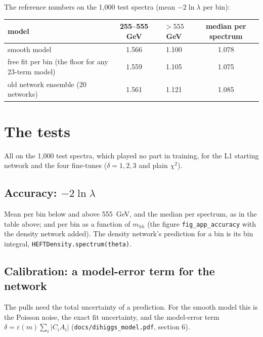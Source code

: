 \documentclass[11pt]{article}
\newcommand{\file}[1]{\nolinkurl{#1}}
\newcommand{\code}[1]{\texttt{#1}}
\newcommand{\mhh}{m_{hh}}
\begin{document}
The reference numbers on the 1,000 test spectra (mean $-2\ln\lambda$ per bin):

\begin{center}
\small
\begin{tabular}{lccc}
\toprule
model & 255--555 GeV & $>555$ GeV & median per spectrum\\
\midrule
smooth model & 1.566 & 1.100 & 1.078\\
free fit per bin (the floor for any 23-term model) & 1.559 & 1.105 & 1.075\\
old network ensemble (20 networks) & 1.561 & 1.121 & 1.085\\
\bottomrule
\end{tabular}
\end{center}

\section{The tests}
\label{sec:tests}

All on the 1,000 test spectra, which played no part in training, for the L1 starting network and
the four fine-tunes ($\delta = 1, 2, 3$ and plain $\chi^2$).

\subsection{Accuracy: $-2\ln\lambda$}

Mean per bin below and above 555~GeV, and the median per spectrum, as in the table above; and per
bin as a function of $\mhh$ (the figure \file{fig_app_accuracy} with the density network added).
The density network's prediction for a bin is its bin integral, \code{HEFTDensity.spectrum(theta)}.

\subsection{Calibration: a model-error term for the network}

The pulls need the total uncertainty of a prediction. For the smooth model this is the Poisson
noise, the exact fit uncertainty, and the model-error term $\delta = \varepsilon(m)\sum_i|C_iA_i|$
(\file{docs/dihiggs_model.pdf}, section 6).
\end{document}
